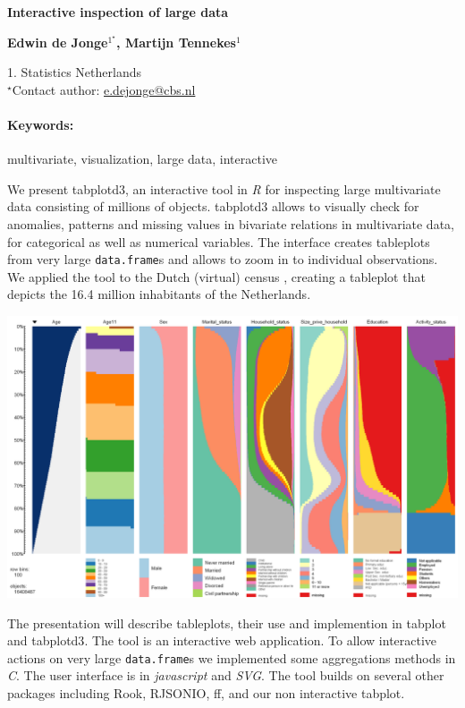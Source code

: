 \documentclass[11pt, a4paper]{article}
\newcommand{\pkg}[1]{{\normalfont\fontseries{b}\selectfont #1}}
\let\proglang=\textit
\let\code=\texttt
\renewcommand{\title}[1]{\begin{center}{\bf \LARGE #1}\end{center}}
\newcommand{\keywords}{\paragraph{Keywords:}}
\begin{document}
\pagestyle{empty}

\title{Interactive inspection of large data}

\begin{center}
  {\bf Edwin de Jonge$^{1^\star}$, Martijn Tennekes$^{1}$}
\end{center}

\begin{affiliations}
1. Statistics Netherlands\\[-2pt]
$^\star$Contact author: \href{mailto:e.dejonge@cbs.nl}{e.dejonge@cbs.nl}\\
\end{affiliations}

\keywords multivariate, visualization, large data, interactive

\vskip 0.8cm

We present \pkg{tabplotd3}, an interactive tool in \proglang{R} for inspecting large multivariate data consisting of millions of objects. 
\pkg{tabplotd3} allows to visually check for anomalies, patterns and missing values in bivariate relations in multivariate data, for categorical as well as numerical variables. The interface creates tableplots \citep{malik10} from very large \code{data.frame}s and allows to zoom in to individual observations. We applied the tool to the Dutch (virtual) census \citep{schulte}, creating a tableplot that depicts the 16.4 million inhabitants of the Netherlands. \\ 

  \begin{center}
    \includegraphics[scale=0.6]{VT2008}
  \end{center}
 
The presentation will describe tableplots, their use and implemention in \pkg{tabplot} and \pkg{tabplotd3}. The tool is an interactive web application. To allow interactive actions on very large \code{data.frame}s we implemented some aggregations methods in \proglang{C}. The user interface is in \proglang{javascript} and \proglang{SVG}. 
The tool builds on several other packages including \pkg{Rook}, \pkg{RJSONIO}, \pkg{ff}, and our non interactive \pkg{tabplot}. 



\end{document}
